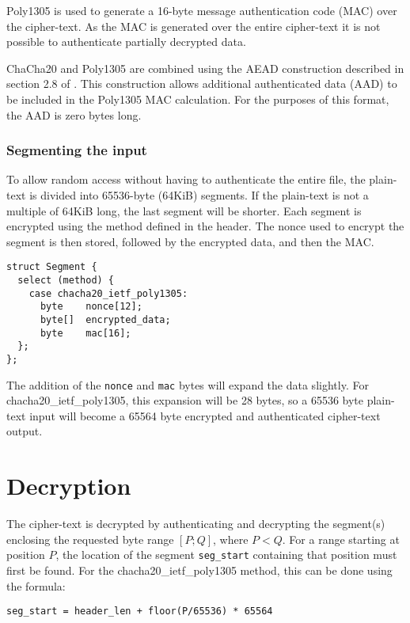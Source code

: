 \documentclass[10pt]{article}
\newcommand{\kw}[1]{\texttt{#1}}
\begin{document}
Poly1305 is used to generate a 16-byte message authentication code (MAC) over the cipher-text.
As the MAC is generated over the entire cipher-text it is not possible to authenticate partially decrypted data.

ChaCha20 and Poly1305 are combined using the AEAD construction described in section 2.8 of \cite{RFC8439}.
This construction allows additional authenticated data (AAD) to be included in the Poly1305 MAC calculation.
For the purposes of this format, the AAD is zero bytes long.

\subsubsection{Segmenting the input}

To allow random access without having to authenticate the entire file, the plain-text is divided into 65536-byte
(64KiB) segments.
If the plain-text is not a multiple of 64KiB long, the last segment will be shorter.
Each segment is encrypted using the method defined in the header.
The nonce used to encrypt the segment is then stored, followed by the encrypted data, and then the MAC.

\begin{verbatim}
struct Segment {
  select (method) {
    case chacha20_ietf_poly1305:
      byte    nonce[12];
      byte[]  encrypted_data;
      byte    mac[16];
  };
};
\end{verbatim}

The addition of the \kw{nonce} and \kw{mac} bytes will expand the data slightly.
For chacha20\_ietf\_poly1305, this expansion will be 28 bytes, so a 65536 byte plain-text input will become a 65564
byte encrypted and authenticated cipher-text output.

\section{Decryption}

The cipher-text is decrypted by authenticating and decrypting the segment(s) enclosing the requested byte range $[P;Q]$,
where $P<Q$.
For a range starting at position $P$, the location of the segment \kw{seg\_start} containing that position must
first be found.
For the chacha20\_ietf\_poly1305 method, this can be done using the formula:

\begin{verbatim}
seg_start = header_len + floor(P/65536) * 65564
\end{verbatim}
\end{document}
